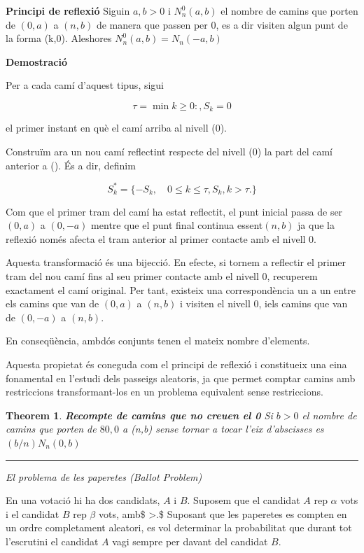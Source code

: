 \documentclass[
  catalan,
]{article}
\newtheorem{theorem}{Theorem}[section]
\theoremstyle{definition}
\theoremstyle{definition}
\theoremstyle{definition}
\theoremstyle{definition}
\theoremstyle{remark}
\begin{document}
\textbf{Principi de reflexió}
Siguin \(a,b>0\) i \(N_n^0(a,b)\) el nombre de camins que porten de \((0,a)\) a \((n,b)\) de manera que passen per 0, es a dir visiten algun punt de la forma (k,0). Aleshores \(N_n^0(a,b)=N_n(-a,b)\)

\textbf{Demostració}

Per a cada camí d'aquest tipus, sigui

\[
\tau=\min{k\ge 0:, S_k=0}
\]

el primer instant en què el camí arriba al nivell (0).

Construïm ara un nou camí reflectint respecte del nivell (0) la part del camí anterior a (\tau). És a dir, definim

\[
S_k^{*}=\{-S_k,\quad  0\le k\le \tau,S_k,  k>\tau.\}
\]

Com que el primer tram del camí ha estat reflectit, el punt inicial passa de ser \((0,a)\) a \((0,-a)\) mentre que el punt final continua essent\((n,b)\) ja que la reflexió només afecta el tram anterior al primer contacte amb el nivell \(0\).

Aquesta transformació és una bijecció. En efecte, si tornem a reflectir el primer tram del nou camí fins al seu primer contacte amb el nivell \(0\), recuperem exactament el camí original. Per tant, existeix una correspondència un a un entre els camins que van de \((0,a)\) a \((n,b)\) i visiten el nivell \(0\), iels camins que van de \((0,-a)\) a \((n,b)\).

En conseqüència, ambdós conjunts tenen el mateix nombre d'elements.

Aquesta propietat és coneguda com el principi de reflexió i constitueix una eina fonamental en l'estudi dels passeigs aleatoris, ja que permet comptar camins amb restriccions transformant-los en un problema equivalent sense restriccions.

\begin{theorem}
\textbf{Recompte de camins que no creuen el 0}
Si \(b>0\) el nombre de camins que porten de \(80,0\) a (n,b) sense tornar a tocar l'eix d'abscisses es \((b/n)N_n(0,b)\)
\end{theorem}

\begin{center}\rule{0.5\linewidth}{0.5pt}\end{center}

\emph{El problema de les paperetes (Ballot Problem)}

En una votació hi ha dos candidats, \(A\) i \(B\). Suposem que el candidat \(A\) rep \(\alpha\) vots i el candidat \(B\) rep \(\beta\) vots, amb\$ \alpha\textgreater{}\beta.\$ Suposant que les paperetes es compten en un ordre completament aleatori, es vol determinar la probabilitat que durant tot l'escrutini el candidat \(A\) vagi sempre per davant del candidat \(B\).
\end{document}
